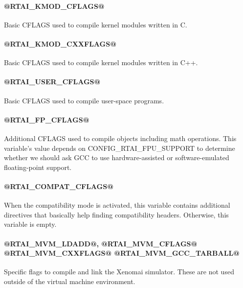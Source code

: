 \paragraph{@RTAI\_KMOD\_CFLAGS@} Basic CFLAGS used to compile kernel modules written in C.

\paragraph{@RTAI\_KMOD\_CXXFLAGS@} Basic CFLAGS used to compile kernel modules written in C++.

\paragraph{@RTAI\_USER\_CFLAGS@} Basic CFLAGS used to compile user-space programs.

\paragraph{@RTAI\_FP\_CFLAGS@}
Additional CFLAGS used to compile objects including math
operations. This variable's value depends on
CONFIG\_RTAI\_FPU\_SUPPORT to determine whether we should ask GCC
to use hardware-assisted or software-emulated floating-point
support.

\paragraph{@RTAI\_COMPAT\_CFLAGS@}
When the compatibility mode is activated, this variable
contains additional directives that basically help finding
compatibility headers. Otherwise, this variable is empty.

\paragraph{@RTAI\_MVM\_LDADD@, @RTAI\_MVM\_CFLAGS@ @RTAI\_MVM\_CXXFLAGS@ @RTAI\_MVM\_GCC\_TARBALL@}
Specific flags to compile and link the Xenomai
simulator. These are not used outside of the virtual machine
environment.

